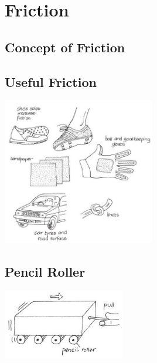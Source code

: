 \section{Friction} 

\begin{multicols}{2}


\section*{Concept of Friction}


\subsection{Useful Friction}

\begin{center}
\includegraphics[width=0.5\textwidth]{./img/vso/useful-friction.jpg}
\end{center}

\subsection{Pencil Roller}

\begin{center}
\includegraphics[width=0.4\textwidth]{./img/vso/pencil-roller.jpg}
\end{center}


\end{multicols}
